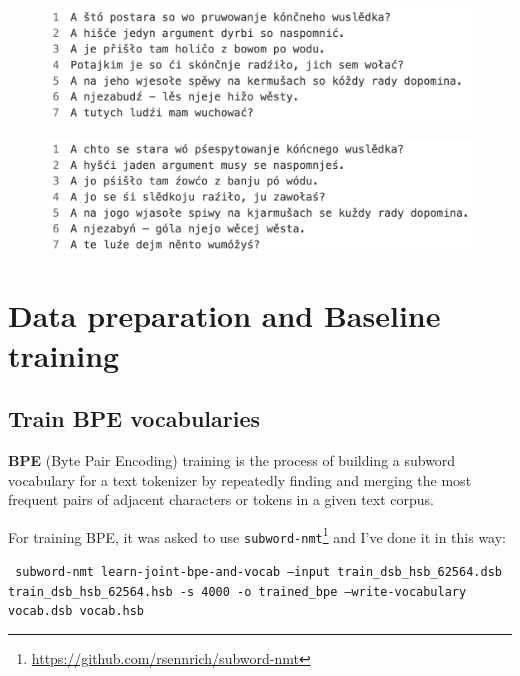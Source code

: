 \documentclass[12pt]{article}
\begin{document}
\begin{figure}
    \begin{minipage}{.5\textwidth}
      \centering
      \includegraphics[width=1\linewidth]{./figures/hsb-example.png}
      \label{fig:hsb-example}
    \end{minipage}%
    \begin{minipage}{.5\textwidth}
      \centering
      \includegraphics[width=1\linewidth]{./figures/dsb-example.png}
      \label{fig:dsb-example}
    \end{minipage}
\end{figure}

\section{Data preparation and Baseline training}
\subsection{Train BPE vocabularies}
\textbf{BPE} (Byte Pair Encoding) training is the process of building a subword vocabulary for a text tokenizer by repeatedly finding and merging the most frequent pairs of adjacent characters or tokens in a given text corpus.

For training BPE, it was asked to use \texttt{subword-nmt}\footnote{\href{https://github.com/rsennrich/subword-nmt}
{https://github.com/rsennrich/subword-nmt}} and I've done it in this way:

\vspace{0.5cm}
\texttt{
  subword-nmt learn-joint-bpe-and-vocab --input train\_dsb\_hsb\_62564.dsb train\_dsb\_hsb\_62564.hsb -s 4000 -o trained\_bpe --write-vocabulary vocab.dsb vocab.hsb
}
\end{document}
